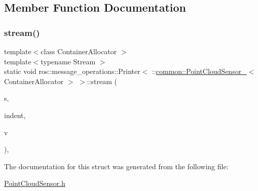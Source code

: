 \subsection{Member Function Documentation}
\mbox{\label{structros_1_1message__operations_1_1Printer_3_01_1_1common_1_1PointCloudSensor___3_01ContainerAllocator_01_4_01_4_acbf2ce09c10067d8017138fd175d8f53}} 
\subsubsection{\texorpdfstring{stream()}{stream()}}
{\footnotesize\ttfamily template$<$class Container\+Allocator $>$ \\
template$<$typename Stream $>$ \\
static void ros\+::message\+\_\+operations\+::\+Printer$<$ \+::\hyperlink{structcommon_1_1PointCloudSensor__}{common\+::\+Point\+Cloud\+Sensor\+\_\+}$<$ Container\+Allocator $>$ $>$\+::stream (\begin{DoxyParamCaption}\item[{Stream \&}]{s,  }\item[{const std\+::string \&}]{indent,  }\item[{const \+::\hyperlink{structcommon_1_1PointCloudSensor__}{common\+::\+Point\+Cloud\+Sensor\+\_\+}$<$ Container\+Allocator $>$ \&}]{v }\end{DoxyParamCaption})\hspace{0.3cm}{\ttfamily [inline]}, {\ttfamily [static]}}



The documentation for this struct was generated from the following file\+:\begin{DoxyCompactItemize}
\item 
\hyperlink{PointCloudSensor_8h}{Point\+Cloud\+Sensor.\+h}\end{DoxyCompactItemize}
